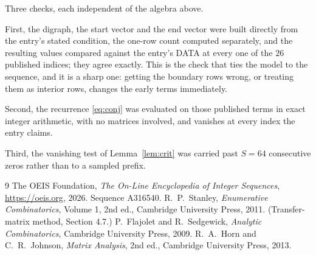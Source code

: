 \documentclass[11pt,a4paper]{article}
\theoremstyle{plain}
\theoremstyle{definition}
\begin{document}
Three checks, each independent of the algebra above.

First, the digraph, the start vector and the end vector were built directly from the
entry's stated condition, the one-row count computed separately, and the resulting values
compared against the entry's DATA at every one of the $26$ published indices; they
agree exactly. This is the check that ties the model to the sequence, and it is a sharp one:
getting the boundary rows wrong, or treating them as interior rows, changes the early terms
immediately.

Second, the recurrence \eqref{eq:conj} was evaluated on those published terms in exact
integer arithmetic, with no matrices involved, and vanishes at every index the entry claims.

Third, the vanishing test of Lemma~\ref{lem:crit} was carried past $S=64$ consecutive
zeros rather than to a sampled prefix.

\begin{thebibliography}{9}
 The OEIS Foundation, \emph{The On-Line Encyclopedia of Integer
Sequences}, \url{https://oeis.org}, 2026. Sequence A316540.
 R.~P.~Stanley, \emph{Enumerative Combinatorics}, Volume 1, 2nd ed.,
Cambridge University Press, 2011. (Transfer-matrix method, Section 4.7.)
 P.~Flajolet and R.~Sedgewick, \emph{Analytic Combinatorics}, Cambridge
University Press, 2009.
 R.~A.~Horn and C.~R.~Johnson, \emph{Matrix Analysis}, 2nd ed., Cambridge
University Press, 2013.
\end{thebibliography}
\end{document}
